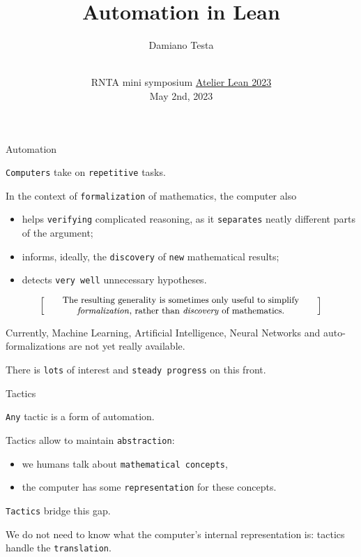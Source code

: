\documentclass{beamer}
\title{Automation in Lean}
\author{Damiano Testa}
\institute[]{University of Warwick}
\date[\href{http://www.rnta.eu/7MSRNTA/lean.html}{Atelier Lean 2023}]{\\
\vspace{50pt}
RNTA mini symposium
\href{http://www.rnta.eu/7MSRNTA/lean.html}{Atelier Lean 2023}\\
\vspace{20pt}
May 2nd, 2023
}
\begin{document}
\frame{\titlepage}

\begin{frame}[fragile]
{Automation}

{\color{violet}\verb`Computers`} take on {\color{violet}\verb`repetitive`} tasks.

In the context of {\color{violet}\verb`formalization`} of mathematics, the computer also

\vspace{-13pt}
\begin{itemize}
\setlength\itemsep{-12pt}
\item
  helps {\color{violet}\verb`verifying`} complicated reasoning, as it {\color{violet}\verb`separates`} neatly different parts of the argument;
\item
  informs, ideally, the {\color{violet}\verb`discovery`} of {\color{violet}\verb`new`} mathematical results;
\item
  detects {\color{violet}\verb`very well`} unnecessary hypotheses.
\end{itemize}

\[
  \left[ \;
  \parbox{0.8\textwidth}{\centering\small
  The resulting generality is sometimes only useful to simplify {\emph{formalization}}, rather than {\emph{discovery}} of mathematics.
  }
  \; \right]
\]

Currently, Machine Learning, Artificial Intelligence, Neural Networks and auto-formalizations are not yet really available.

There is {\color{violet}\verb`lots`} of interest and {\color{violet}\verb`steady progress`} on this front.
\end{frame}

\begin{frame}[fragile]{Tactics}

{\color{violet}\verb`Any`} tactic is a form of automation.

Tactics allow to maintain {\color{violet}\verb`abstraction`}:

\vspace{-13pt}
\begin{itemize}
\setlength\itemsep{-12pt}
\item
  we humans talk about {\color{violet}\verb`mathematical concepts`},
\item
  the computer has some {\color{violet}\verb`representation`} for these concepts.
\end{itemize}

{\color{violet}\verb`Tactics`} bridge this gap.

We do not need to know what the computer's internal representation is: tactics handle the {\color{violet}\verb`translation`}.
\end{frame}
\end{document}
